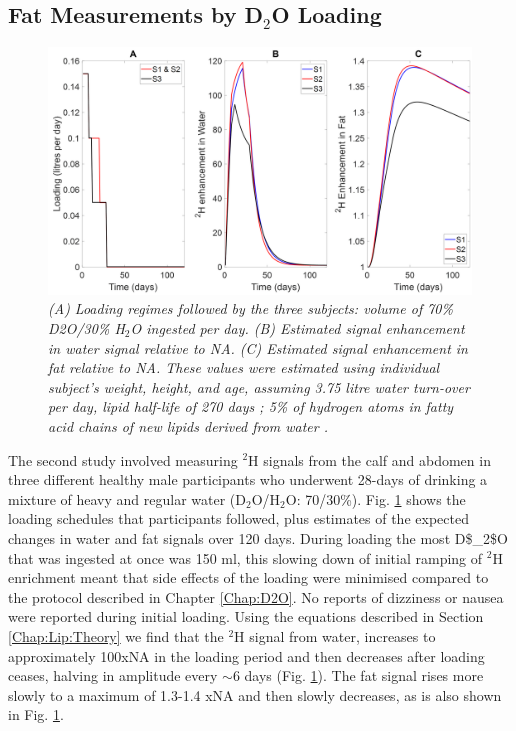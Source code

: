 \subsection{Fat Measurements by D$_2$O Loading}

\begin{figure}
    \centering
    \includegraphics[width=1\textwidth]{Figures/Lipid/Loading_Routine.png}
    \caption{\textit{(A) Loading regimes followed by the three subjects: volume of 70\% D2O/30\% H$_2$O ingested per day. (B) Estimated signal enhancement in water signal relative to NA. (C) Estimated signal enhancement in fat relative to NA. These values were estimated using individual subject’s weight, height, and age, assuming 3.75 litre water turn-over per day, lipid half-life of 270 days \cite{Arner2011DynamicsDisease, Spalding2017ImpactTissue}; 5\% of hydrogen atoms in fatty acid chains of new lipids derived from water \cite{Turner2003MeasurementMIDA}.}}
    \label{fig:Lip:Load}
\end{figure}

The second study involved measuring $^2$H signals from the calf and abdomen in three different healthy male participants who underwent 28-days of drinking a mixture of heavy and regular water (D$_2$O/H$_2$O: 70/30\%). Fig. \ref{fig:Lip:Load} shows the loading schedules that participants followed, plus estimates of the expected changes in water and fat signals over 120 days. During loading the most \ac{D$_2$O} that was ingested at once was 150 ml, this slowing down of initial ramping of $^2$H enrichment meant that side effects of the loading were minimised compared to the protocol described in Chapter \ref{Chap:D2O}. No reports of dizziness or nausea were reported during initial loading. Using the equations described in Section \ref{Chap:Lip:Theory} we find that the $^2$H signal from water, increases to approximately 100x\ac{NA} in the loading period and then decreases after loading ceases, halving in amplitude every $\sim$6 days (Fig. \ref{fig:Lip:Load}). The fat signal rises more slowly to a maximum of 1.3-1.4 x\ac{NA} and then slowly decreases, as is also shown in Fig. \ref{fig:Lip:Load}.


